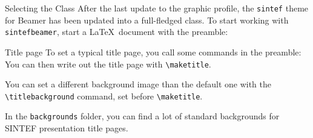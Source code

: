 \documentclass[10pt,aspectratio=169]{beamer}
\begin{document}
\begin{frame}[fragile]{Selecting the Class}
After the last update to the graphic profile, the \texttt{sintef} theme for
Beamer has been updated into a full-fledged class.
To start working with \texttt{sintefbeamer}, start a \LaTeX\ document with the
preamble:
\end{frame}

\begin{frame}[fragile]{Title page}
To set a typical title page, you call some commands in the preamble:
You can then write out the title page with \verb|\maketitle|.

You can set a different background image than the default one with the
\verb|\titlebackground| command, set before \verb|\maketitle|.

In the \texttt{backgrounds} folder, you can find a lot of standard backgrounds
for SINTEF presentation title pages.

\end{frame}
\end{document}
